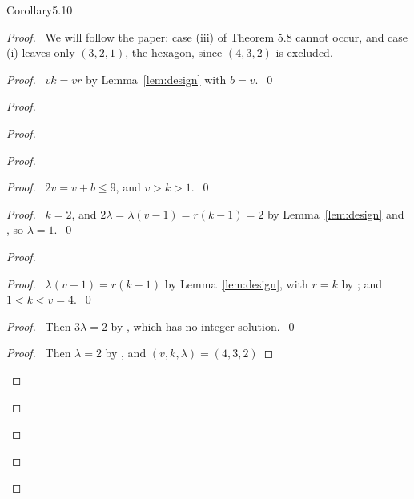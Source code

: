 \begin{cgss}{Corollary}{5.10}\label{cor:5.10}
\end{cgss}
\begin{proof}
 \pfsketch\ We will follow the paper: case (iii) of Theorem 5.8 cannot occur, and case (i)
 leaves only $(3,2,1)$, the hexagon, since $(4,3,2)$ is excluded.
 \begin{proof}\pf\ $vk=vr$ by Lemma~\ref{lem:design} with $b=v$.~\qed\end{proof}
 \begin{proof}
  \begin{proof}
   \begin{proof}
    \begin{proof}\pf\ $2v=v+b\le9$, and $v>k>1$.~\qed\end{proof}
    \begin{proof}\pf\ $k=2$, and $2\lambda=\lambda(v-1)=r(k-1)=2$ by Lemma~\ref{lem:design}
     and , so $\lambda=1$.~\qed\end{proof}
    \begin{proof}
     \begin{proof}\pf\ $\lambda(v-1)=r(k-1)$ by Lemma~\ref{lem:design}, with $r=k$ by
      ; and $1<k<v=4$.~\qed\end{proof}
     \begin{proof}\pf\ Then $3\lambda=2$ by , which has no integer
      solution.~\qed\end{proof}
     \begin{proof}\pf\ Then $\lambda=2$ by , and $(v,k,\lambda)=(4,3,2)$

\end{proof}
\end{proof}
\end{proof}
\end{proof}
\end{proof}
\end{proof}
